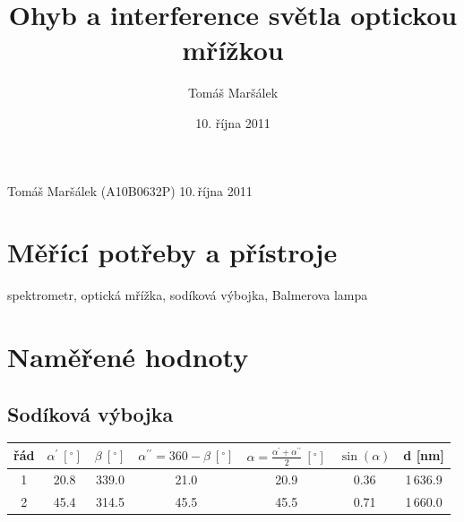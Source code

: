 \documentclass[10pt]{article}
\title{Ohyb a interference světla optickou mřížkou}
\author{Tomáš Maršálek}
\date{10. října 2011}
\begin{document}
 {Tomáš Maršálek}
 {(A10B0632P)}
 {10.\,října 2011}

\section{Měřící potřeby a přístroje}
spektrometr, optická mřížka, sodíková výbojka, Balmerova lampa

\section{Naměřené hodnoty}
\subsection{Sodíková výbojka}
\begin{tabular}[b]{|c|c|c|c|c|c|c|}
	\hline
	\bigstrut
	řád & $\alpha^\prime~[^\circ]$ & $\beta~[^\circ]$ & 
	$\alpha^{\prime\prime} = 360 - \beta~[^\circ]$ &
	$\alpha = \frac{\alpha^\prime + \alpha^{\prime\prime}}{2}~[^\circ]$ &
	$\sin(\alpha)$ & d [nm] \\
	\hline
	1 & 20.8 & 339.0 & 21.0 & 20.9 & 0.36 & 1\,636.9 \\
	2 & 45.4 & 314.5 & 45.5 & 45.5 & 0.71 & 1\,660.0 \\
	\hline
\end{tabular}
\end{document}

